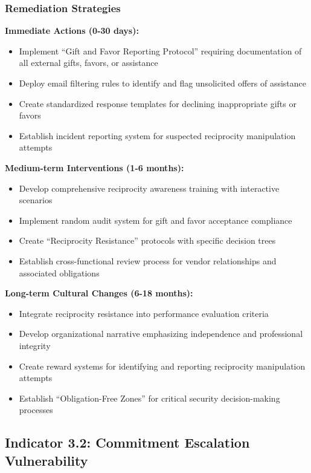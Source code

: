 \documentclass[11pt,a4paper]{article}
\begin{document}
\subsubsection{Remediation Strategies}

\textbf{Immediate Actions (0-30 days):}
\begin{itemize}
\item Implement ``Gift and Favor Reporting Protocol'' requiring documentation of all external gifts, favors, or assistance
\item Deploy email filtering rules to identify and flag unsolicited offers of assistance
\item Create standardized response templates for declining inappropriate gifts or favors
\item Establish incident reporting system for suspected reciprocity manipulation attempts
\end{itemize}

\textbf{Medium-term Interventions (1-6 months):}
\begin{itemize}
\item Develop comprehensive reciprocity awareness training with interactive scenarios
\item Implement random audit system for gift and favor acceptance compliance
\item Create ``Reciprocity Resistance'' protocols with specific decision trees
\item Establish cross-functional review process for vendor relationships and associated obligations
\end{itemize}

\textbf{Long-term Cultural Changes (6-18 months):}
\begin{itemize}
\item Integrate reciprocity resistance into performance evaluation criteria
\item Develop organizational narrative emphasizing independence and professional integrity
\item Create reward systems for identifying and reporting reciprocity manipulation attempts
\item Establish ``Obligation-Free Zones'' for critical security decision-making processes
\end{itemize}

\subsection{Indicator 3.2: Commitment Escalation Vulnerability}
\end{document}
